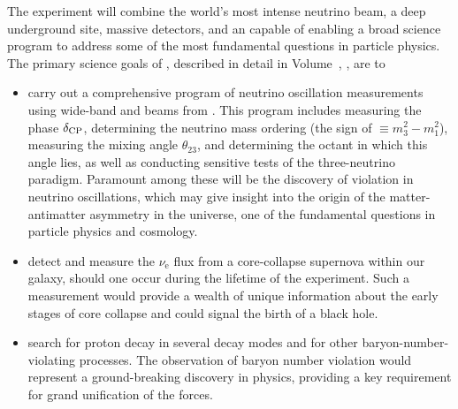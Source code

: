The  experiment will combine the world's most intense neutrino beam, a deep underground site, massive  detectors, and an    capable of enabling a broad science program to address some of the most fundamental questions in particle physics. 
The primary science goals of , described in detail in Volume~\volnumberphysics{}, \voltitlephysics{}, are to 
\begin{itemize}

\item carry out a comprehensive program of neutrino oscillation measurements using wide-band \numu and \anumu beams from . This program includes measuring the   phase $\delta_{\rm CP}$, determining the neutrino mass ordering (the sign of $ \equiv m_3^2-m_1^2$), measuring the mixing angle $\theta_{23}$, and  determining the octant in which this angle lies,
as well as conducting sensitive tests of the three-neutrino paradigm. Paramount among these will be the discovery of  violation in neutrino oscillations, which may give insight into the origin of the matter-antimatter asymmetry in the universe, one of the fundamental questions in particle physics and cosmology. 

\item detect and measure the $\nu_\text{e}$ flux from a core-collapse supernova within our galaxy, should one occur during the lifetime of the  experiment. Such a measurement would provide a wealth of unique information about the early stages of core collapse and could signal the birth of a black hole.
    
\item search for proton decay in several decay modes and for other baryon-number-violating processes. The observation of baryon number violation would represent a ground-breaking discovery in physics, providing a key requirement for grand unification of the forces. 

\end{itemize}

